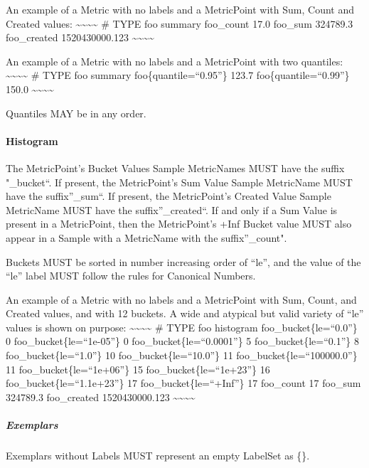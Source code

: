 \documentclass[a4paper,12pt,notitlepage,twoside,openright]{article}
\begin{document}
An example of a Metric with no labels and a MetricPoint with Sum, Count
and Created values:
\textasciitilde\textasciitilde\textasciitilde\textasciitilde{} \# TYPE
foo summary foo\_count 17.0 foo\_sum 324789.3 foo\_created
1520430000.123
\textasciitilde\textasciitilde\textasciitilde\textasciitilde{}

An example of a Metric with no labels and a MetricPoint with two
quantiles:
\textasciitilde\textasciitilde\textasciitilde\textasciitilde{} \# TYPE
foo summary foo\{quantile=``0.95''\} 123.7 foo\{quantile=``0.99''\}
150.0 \textasciitilde\textasciitilde\textasciitilde\textasciitilde{}

Quantiles MAY be in any order.

\hypertarget{histogram-1}{%
\paragraph{Histogram}\label{histogram-1}}

The MetricPoint's Bucket Values Sample MetricNames MUST have the suffix
"\_bucket``. If present, the MetricPoint's Sum Value Sample MetricName
MUST have the suffix''\_sum``. If present, the MetricPoint's Created
Value Sample MetricName MUST have the suffix''\_created``. If and only
if a Sum Value is present in a MetricPoint, then the MetricPoint's +Inf
Bucket value MUST also appear in a Sample with a MetricName with the
suffix''\_count".

Buckets MUST be sorted in number increasing order of ``le'', and the
value of the ``le'' label MUST follow the rules for Canonical Numbers.

An example of a Metric with no labels and a MetricPoint with Sum, Count,
and Created values, and with 12 buckets. A wide and atypical but valid
variety of ``le'' values is shown on purpose:
\textasciitilde\textasciitilde\textasciitilde\textasciitilde{} \# TYPE
foo histogram foo\_bucket\{le=``0.0''\} 0 foo\_bucket\{le=``1e-05''\} 0
foo\_bucket\{le=``0.0001''\} 5 foo\_bucket\{le=``0.1''\} 8
foo\_bucket\{le=``1.0''\} 10 foo\_bucket\{le=``10.0''\} 11
foo\_bucket\{le=``100000.0''\} 11 foo\_bucket\{le=``1e+06''\} 15
foo\_bucket\{le=``1e+23''\} 16 foo\_bucket\{le=``1.1e+23''\} 17
foo\_bucket\{le=``+Inf''\} 17 foo\_count 17 foo\_sum 324789.3
foo\_created 1520430000.123
\textasciitilde\textasciitilde\textasciitilde\textasciitilde{}

\hypertarget{exemplars-1}{%
\subparagraph{Exemplars}\label{exemplars-1}}

Exemplars without Labels MUST represent an empty LabelSet as \{\}.
\end{document}
